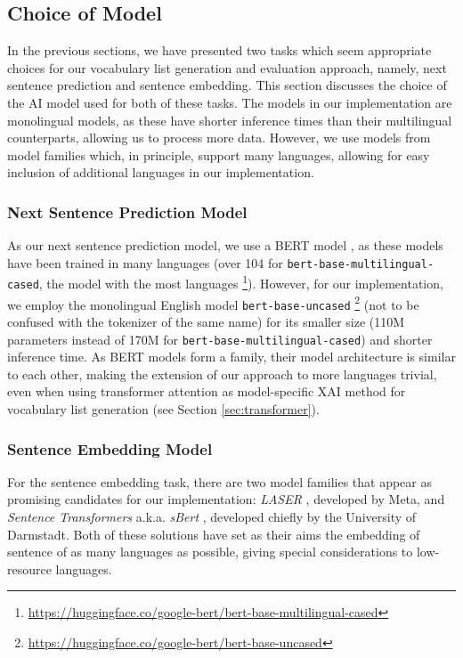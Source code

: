 \subsection{Choice of Model}
In the previous sections, we have presented two tasks which seem appropriate choices for our vocabulary list generation and evaluation approach, namely, next sentence prediction and sentence embedding.
This section discusses the choice of the AI model used for both of these tasks.
The models in our implementation are monolingual models, as these have shorter inference times than their multilingual counterparts, allowing us to process more data.
However, we use models from model families which, in principle, support many languages, allowing for easy inclusion of additional languages in our implementation.

\subsubsection{Next Sentence Prediction Model}
As our next sentence prediction model, we use a BERT model \cite{kentonBertPretrainingDeep2019}, as these models have been trained in many languages (over 104 for \texttt{bert-base-multilingual-cased}, the model with the most languages \footnote{\url{https://huggingface.co/google-bert/bert-base-multilingual-cased}}).
However, for our implementation, we employ the monolingual English model \texttt{bert-base-uncased} \footnote{\url{https://huggingface.co/google-bert/bert-base-uncased}} (not to be confused with the tokenizer of the same name) for its smaller size (110M parameters instead of 170M for \texttt{bert-base-multilingual-cased}) and shorter inference time.
As BERT models form a family, their model architecture is similar to each other, making the extension of our approach to more languages trivial, even when using transformer attention as model-specific XAI method for vocabulary list generation (see Section \ref{sec:transformer}).


\subsubsection{Sentence Embedding Model}
For the sentence embedding task, there are two model families that appear as promising candidates for our implementation:
\textit{LASER} \cite{artetxeMassivelyMultilingualSentence2019}, developed by Meta, and \textit{Sentence Transformers} a.k.a. \textit{sBert} \cite{reimersMakingMonolingualSentence2020}, developed chiefly by the University of Darmstadt.
Both of these solutions have set as their aims the embedding of sentence of as many languages as possible, giving special considerations to low-resource languages.


